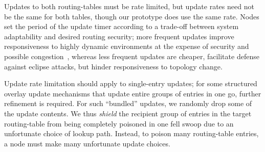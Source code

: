 \documentclass[10pt,twocolumn]{article}
\begin{document}
Updates to both routing-tables must be rate
limited, but update rates need not be the same for both
tables, though our prototype does use the same rate.
Nodes set the period of the update
timer according to a trade-off between system adaptability and desired
routing security;  more frequent updates improve responsiveness to highly
dynamic environments at the expense of security and possible
congestion~\cite{Rhea2004}, whereas less frequent updates are cheaper,
facilitate defense against eclipse attacks, but hinder responsiveness to
topology change.

Update rate limitation should apply to single-entry updates; for some
structured overlay
update mechanisms that update entire groups of entries in one go, further
refinement is required.  For such ``bundled'' updates, we randomly
drop some of the update contents.   We thus \emph{shield} the recipient
group of entries in the target routing-table from being completely
poisoned in one fell swoop due to an unfortunate choice of lookup
path. Instead, to poison many routing-table entries, a node must make many unfortunate
update choices.


\label{sec:Optimizations}
\end{document}
